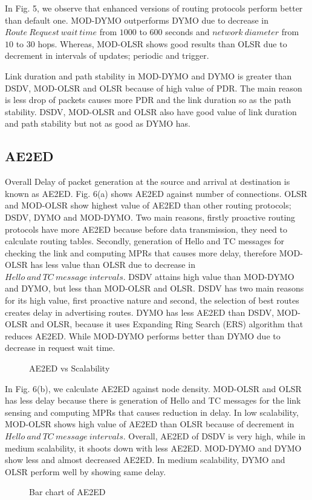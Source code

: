 \documentclass[journal]{IEEEtran}
\begin{document}
In Fig. 5, we observe that enhanced versions of routing protocols perform better than default one. MOD-DYMO outperforms DYMO due to decrease in $Route~Request~wait~time$ from $1000$ to $600$ seconds and $network~diameter$ from $10$ to $30$ hops. Whereas, MOD-OLSR shows good results than OLSR due to decrement in intervals of updates; periodic and trigger.

Link duration and path stability in MOD-DYMO and DYMO is greater than DSDV, MOD-OLSR and OLSR because of high value of PDR. The main reason is less drop of packets causes more PDR and the link duration so as the path stability. DSDV, MOD-OLSR and OLSR also have good value of link duration and path stability but not as good as DYMO has.

\subsection{AE2ED}
Overall Delay of packet generation at the source and arrival at destination is known as AE2ED. Fig. 6(a) shows AE2ED against number of connections. OLSR and MOD-OLSR show highest value of AE2ED than other routing protocols; DSDV, DYMO and MOD-DYMO. Two main reasons, firstly proactive routing protocols have more AE2ED because before data transmission, they need to calculate routing tables. Secondly, generation of Hello and TC messages for checking the link and computing MPRs that causes more delay, therefore MOD-OLSR has less value than OLSR due to decrease in $Hello~and~TC~message~intervals$. DSDV attains high value than MOD-DYMO and DYMO, but less than MOD-OLSR and OLSR. DSDV has two main reasons for its high value, first proactive nature and second, the selection of best routes creates delay in advertising routes. DYMO has less AE2ED than DSDV, MOD-OLSR and OLSR, because it uses Expanding Ring Search (ERS) algorithm that reduces AE2ED. While MOD-DYMO performs better than DYMO due to decrease in request wait time.
\begin{figure}[h]
  \centering
 \caption{AE2ED vs Scalability}
\end{figure}

In Fig. 6(b), we calculate AE2ED against node density. MOD-OLSR and OLSR has less delay because there is generation of Hello and TC messages for the link sensing and computing MPRs that causes reduction in delay. In low scalability, MOD-OLSR shows high value of AE2ED than OLSR because of decrement in $Hello~and~TC~message~intervals$. Overall, AE2ED of DSDV is very high, while in medium scalability, it shoots down with less AE2ED. MOD-DYMO and DYMO show less and almost decreased AE2ED. In medium scalability, DYMO and OLSR perform well by showing same delay.
\begin{figure}[h]
  \centering
 \caption{Bar chart of AE2ED }
\end{figure}
\end{document}
